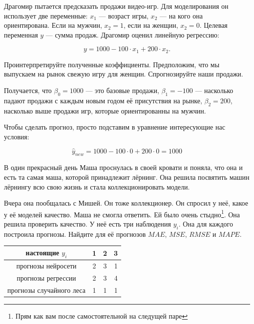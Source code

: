 \documentclass[12pt, a4paper, oneside]{article}
\theoremstyle{plain} %
\theoremstyle{definition}
\begin{document}
\begin{problem}{ }
Драгомир пытается предсказать продажи видео-игр.  Для моделирования он использует две переменные: $x_1$ --- возраст игры, $x_2$ --- на кого она ориентирована. Если на мужчин, $x_2=1$, если на женщин, $x_2=0$. Целевая переменная $y$ --- сумма продаж. Драгомир оценил линейную регрессию: 

$$ y = 1000 - 100 \cdot  x_1 + 200 \cdot  x_2.$$

Проинтерпретируйте полученные коэффициенты.  Предположим, что мы выпускаем на рынок свежую игру для женщин. Спрогнозируйте наши продажи. 
\end{problem}

\begin{solution}
Получается, что $\beta_0 = 1000$ --- это базовые продажи, $\beta_1 = -100$ --- насколько падают продажи с каждым новым годом её присутствия на рынке, $\beta_2 = 200$, насколько выше продажи игр, которые ориентированны на мужчин.

Чтобы сделать прогноз, просто подставим в уравнение интересующие нас условия: 

$$ 
\hat y_{new} = 1000 - 100 \cdot 0 + 200 \cdot 0 = 1000
$$
\end{solution}


\begin{problem}{ }
В один прекрасный день Маша проснулась в своей кровати и поняла, что она и есть та самая маша, которой принадлежит лёрнинг. Она решила посвятить машин лёрнингу всю свою жизнь и стала коллекционировать модели.

Вчера она пообщалась с Мишей. Он тоже коллекционер. Он спросил у неё, какое у её моделей качество. Маша не смогла ответить. Ей было очень стыдно\footnote{Прям как вам после самостоятельной на следущей паре}. Она решила проверить качество. У неё есть три наблюдения $y_i$. Она для каждого построила прогнозы. Найдите для её прогнозов $MAE$, $MSE$, $RMSE$ и $MAPE$. 

\begin{center}
	\begin{tabular}{c|c|c|c}
		настоящие $y_i$ &  1 & 2 & 3 \\
		\hline
		прогнозы нейросети & 2 & 3 & 1  \\
		прогнозы регрессии &  2 & 3 & 4 \\
		прогнозы случайного леса & 1 & 1 & 1 \\
	\end{tabular}
\end{center}
\end{problem}
\end{document}
